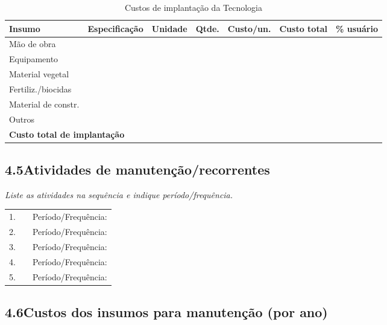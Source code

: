 \begin{table}[htbp]
\centering\small
\caption{Custos de implantação da Tecnologia}
\label{tab:app_cost_estab}
\begin{tabular}{p{2.8cm}p{2.5cm}lrrrl}
\toprule
\textbf{Insumo} & \textbf{Especificação} & \textbf{Unidade} & \textbf{Qtde.} & \textbf{Custo/un.} & \textbf{Custo total} & \textbf{\% usuário} \\
\midrule
Mão de obra      & & & & & & \\
Equipamento      & & & & & & \\
Material vegetal & & & & & & \\
Fertiliz./biocidas & & & & & & \\
Material de constr. & & & & & & \\
Outros           & & & & & & \\
\midrule
\multicolumn{5}{l}{\textbf{Custo total de implantação}} & & \\
\bottomrule
\end{tabular}
\end{table}

\subsection{4.5\quad Atividades de manutenção/recorrentes}
\textit{Liste as atividades na sequência e indique período/frequência.}\\[4pt]
\begin{tabular}{clp{5cm}}
1. & \dotfill & Período/Frequência: \dotfill \\
2. & \dotfill & Período/Frequência: \dotfill \\
3. & \dotfill & Período/Frequência: \dotfill \\
4. & \dotfill & Período/Frequência: \dotfill \\
5. & \dotfill & Período/Frequência: \dotfill \\
\end{tabular}

\subsection{4.6\quad Custos dos insumos para manutenção (por ano)}

